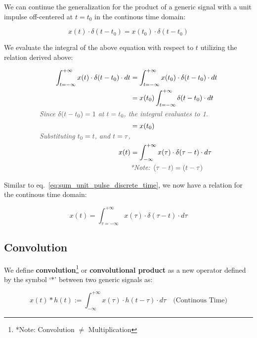 \documentclass[letterpaper,12pt]{article}
\newcommand{\annot}[1]{\textcolor{darkgray}{\textit{#1}}}
\begin{document}
We can continue the generalization for the product of a generic signal with a unit impulse off-centered at $t=t_{0}$ in the continous time domain:

\[x(t) \cdot \delta(t-t_{0}) = x(t_{0}) \cdot \delta(t-t_{0})\]

We evaluate the integral of the above equation with respect to $t$ utilizing the relation derived above:

\begin{align*}
    \int_{t=-\infty}^{+\infty} x(t) \cdot \delta(t-t_{0})\cdot dt & = \int_{t=-\infty}^{+\infty} x(t_{0}) \cdot \delta(t-t_{0})\cdot dt \\
                                                                  & =x(t_{0})\int_{t=-\infty}^{+\infty} \delta(t-t_{0})\cdot dt         \\
    \intertext{\annot{Since $\delta(t-t_0) = 1$ at $t=t_{0}$, the integral evaluates to 1.}}
                                                                  & = x(t_{0})
    \\
    \annot{Substituting $t_{0}=t$, and $t=\tau$,}
    \\
    x(t)                                                          & = \int_{-\infty}^{+\infty} x(\tau) \cdot \delta(\tau-t)\cdot d\tau  \\
                                                                  & \annot{*Note: $ (\tau-t) = (t-\tau)$}
\end{align*}

Similar to eq.~\ref{eq:sum_unit_pulse_discrete_time}, we now have a relation for the continous time domain:

\begin{equation}
    \label{eq:sum_unit_pulse_cont_time}
    x(t) = \int_{\tau=-\infty}^{+\infty} x(\tau) \cdot \delta(\tau-t)\cdot d\tau
\end{equation}

\subsection*{Convolution}
We define \textbf{convolution}\footnote{*Note: Convolution $\neq$ Multiplication} or \textbf{convolutional product} as a new operator defined by the symbol `$*$' between two generic signals as:

\begin{equation}
    x(t) * h(t) := \int_{-\infty}^{+\infty} x(\tau) \cdot h(t-\tau)\cdot d\tau \quad \text{(Continous Time)}
    \label{eq:convolution_continous_time}
\end{equation}
\end{document}
